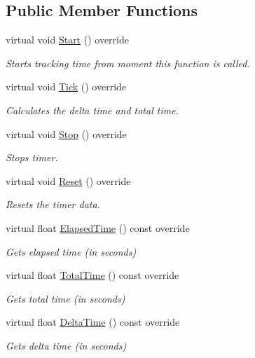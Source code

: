 \subsection*{Public Member Functions}
\begin{DoxyCompactItemize}
\item 
virtual void \hyperlink{classHatchit_1_1Core_1_1Linux_1_1Timer_ad71a11915c848a40be11b2a2a1c24375}{Start} () override
\begin{DoxyCompactList}\small\item\em Starts tracking time from moment this function is called. \end{DoxyCompactList}\item 
virtual void \hyperlink{classHatchit_1_1Core_1_1Linux_1_1Timer_aafd5b502c0fda46aad2f38b47a6974d6}{Tick} () override
\begin{DoxyCompactList}\small\item\em Calculates the delta time and total time. \end{DoxyCompactList}\item 
virtual void \hyperlink{classHatchit_1_1Core_1_1Linux_1_1Timer_a93adf56776127d8c3215024f6566837b}{Stop} () override
\begin{DoxyCompactList}\small\item\em Stops timer. \end{DoxyCompactList}\item 
virtual void \hyperlink{classHatchit_1_1Core_1_1Linux_1_1Timer_a1159f074a5290718acee991decd80af3}{Reset} () override
\begin{DoxyCompactList}\small\item\em Resets the timer data. \end{DoxyCompactList}\item 
virtual float \hyperlink{classHatchit_1_1Core_1_1Linux_1_1Timer_aa8e7a94df99e3953eebbb0d08d1dd8a2}{Elapsed\+Time} () const override
\begin{DoxyCompactList}\small\item\em Gets elapsed time (in seconds) \end{DoxyCompactList}\item 
virtual float \hyperlink{classHatchit_1_1Core_1_1Linux_1_1Timer_a9ca1371d09e3fd4ddb72ea4f6b9fb9d9}{Total\+Time} () const override
\begin{DoxyCompactList}\small\item\em Gets total time (in seconds) \end{DoxyCompactList}\item 
virtual float \hyperlink{classHatchit_1_1Core_1_1Linux_1_1Timer_aefd9ad0a2297d03e3877c0c6c900bd1c}{Delta\+Time} () const override
\begin{DoxyCompactList}\small\item\em Gets delta time (in seconds) \end{DoxyCompactList}\end{DoxyCompactItemize}
